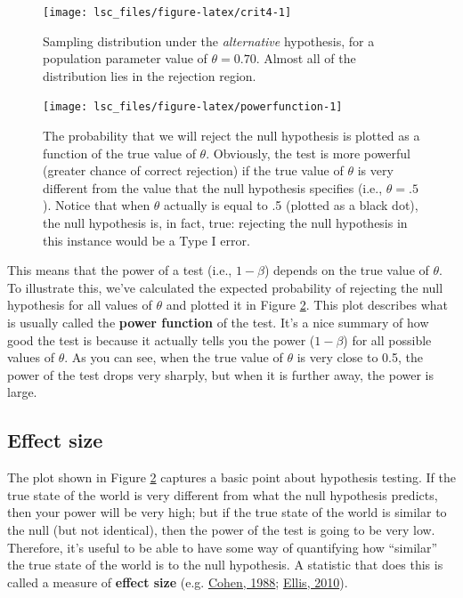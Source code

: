 \documentclass[
]{book}
\theoremstyle{definition}
\theoremstyle{definition}
\theoremstyle{definition}
\theoremstyle{definition}
\theoremstyle{remark}
\begin{document}
\begin{figure}

{\centering \texttt{[image: lsc\_files/figure-latex/crit4-1]} 

}

\caption{Sampling distribution under the \emph{alternative} hypothesis, for a population parameter value of \(\theta = 0.70\). Almost all of the distribution lies in the rejection region.}\label{fig:crit4}
\end{figure}

\begin{figure}

{\centering \texttt{[image: lsc\_files/figure-latex/powerfunction-1]} 

}

\caption{The probability that we will reject the null hypothesis is plotted as a function of the true value of $\theta$. Obviously, the test is more powerful (greater chance of correct rejection) if the true value of $\theta$ is very different from the value that the null hypothesis specifies (i.e., $\theta=.5$). Notice that when $\theta$ actually is equal to .5 (plotted as a black dot), the null hypothesis is, in fact, true: rejecting the null hypothesis in this instance would be a Type I error.}\label{fig:powerfunction}
\end{figure}

This means that the power of a test (i.e., \(1-\beta\)) depends on the true value of \(\theta\). To illustrate this, we've calculated the expected probability of rejecting the null hypothesis for all values of \(\theta\) and plotted it in Figure \ref{fig:powerfunction}. This plot describes what is usually called the \textbf{power function} of the test. It's a nice summary of how good the test is because it actually tells you the power (\(1-\beta\)) for all possible values of \(\theta\). As you can see, when the true value of \(\theta\) is very close to 0.5, the power of the test drops very sharply, but when it is further away, the power is large.

\hypertarget{effect-size}{%
\subsection{Effect size}\label{effect-size}}

The plot shown in Figure \ref{fig:powerfunction} captures a basic point about hypothesis testing. If the true state of the world is very different from what the null hypothesis predicts, then your power will be very high; but if the true state of the world is similar to the null (but not identical), then the power of the test is going to be very low. Therefore, it's useful to be able to have some way of quantifying how ``similar'' the true state of the world is to the null hypothesis. A statistic that does this is called a measure of \textbf{effect size} (e.g. \protect\hyperlink{ref-Cohen1988}{Cohen, 1988}; \protect\hyperlink{ref-Ellis2010}{Ellis, 2010}).
\end{document}
